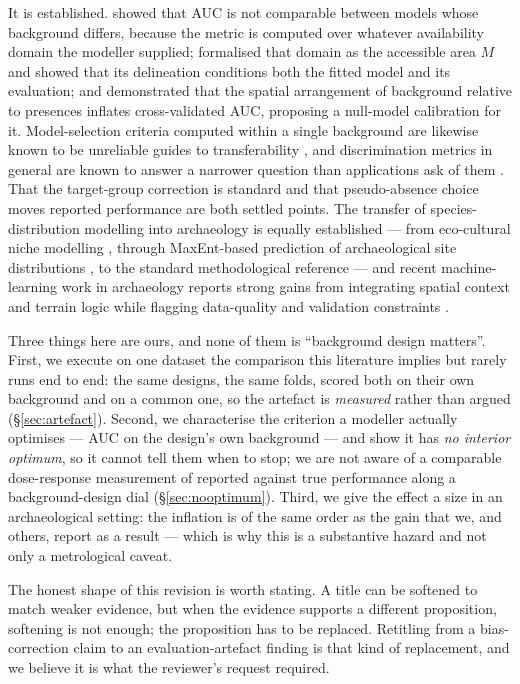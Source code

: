 \documentclass[12pt]{article}
\begin{document}
It is established. \citet{lobo2008} showed that AUC is not comparable between models whose background differs, because the metric is computed over whatever availability domain the modeller supplied; \citet{barve2011} formalised that domain as the accessible area $M$ and showed that its delineation conditions both the fitted model and its evaluation; and \citet{hijmans2012} demonstrated that the spatial arrangement of background relative to presences inflates cross-validated AUC, proposing a null-model calibration for it.
Model-selection criteria computed within a single background are likewise known to be unreliable guides to transferability \citep{warren2011, radosavljevic2014}, and discrimination metrics in general are known to answer a narrower question than applications ask of them \citep{guillera2015, lobo2010}.
That the target-group correction is standard \citep{phillips2009} and that pseudo-absence choice moves reported performance \citep{barbet2012, senay2013} are both settled points.
The transfer of species-distribution modelling into archaeology is equally established --- from eco-cultural niche modelling \citep{banks2006}, through MaxEnt-based prediction of archaeological site distributions \citep{yaworsky2020, howey2016, noviello2018}, to the standard methodological reference \citep{franklin2009} --- and recent machine-learning work in archaeology reports strong gains from integrating spatial context and terrain logic while flagging data-quality and validation constraints \citep{castiello2021, wang2023, comer2023}.

Three things here are ours, and none of them is ``background design matters''.
First, we execute on one dataset the comparison this literature implies but rarely runs end to end: the same designs, the same folds, scored both on their own background and on a common one, so the artefact is \emph{measured} rather than argued (\S\ref{sec:artefact}).
Second, we characterise the criterion a modeller actually optimises --- AUC on the design's own background --- and show it has \emph{no interior optimum}, so it cannot tell them when to stop; we are not aware of a comparable dose-response measurement of reported against true performance along a background-design dial (\S\ref{sec:nooptimum}).
Third, we give the effect a size in an archaeological setting: the inflation is of the same order as the gain that we, and others, report as a result --- which is why this is a substantive hazard and not only a metrological caveat.

The honest shape of this revision is worth stating.
A title can be softened to match weaker evidence, but when the evidence supports a different proposition, softening is not enough; the proposition has to be replaced.
Retitling from a bias-correction claim to an evaluation-artefact finding is that kind of replacement, and we believe it is what the reviewer's request required.
\end{document}
